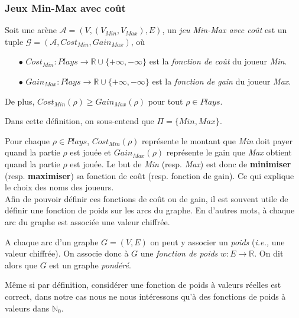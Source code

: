 
\subsubsection{Jeux Min-Max avec coût}


\begin{defi} $\text{ }$\\
	Soit une arène $\mathcal{A} = (V, (V_{Min}, V_{Max}), E) $, 
	un \textit{jeu Min-Max avec coût} est un tuple $\mathcal{G} = (\mathcal{A}, Cost_{Min}, Gain_{Max})$, où
	\begin{enumerate}
		\item[$\bullet$] $Cost_{Min}: Plays \rightarrow \mathbb{R} \cup \{+ \infty, -\infty \}$ est la \textit{fonction de coût} du joueur \textit{Min}.
		\item[$\bullet$] $Gain_{Max}: Plays \rightarrow \mathbb{R} \cup \{ + \infty, -\infty \}$ est la \textit{fonction de gain} du joueur \textit{Max}.
	\end{enumerate}
	
De plus, $Cost_{Min}(\rho) \geq Gain_{Max}(\rho)$ pour tout $\rho \in Plays$.
		
\end{defi}

\begin{rem}
	Dans cette définition, on sous-entend que $\Pi = \{ Min, Max \}$.
\end{rem}

Pour chaque $\rho \in Plays$, $Cost_{Min}(\rho)$ représente le montant que \textit{Min} doit payer quand la partie $\rho$ est jouée et $Gain_{Max}(\rho)$ représente le gain que \textit{Max} obtient quand la partie $\rho$ est jouée.
Le but de \textit{Min} (resp. \textit{Max}) est donc de \textbf{minimiser} (resp. \textbf{maximiser}) sa fonction de coût (resp. fonction de gain). Ce qui explique le choix des noms des joueurs.\\

Afin de pouvoir définir ces fonctions de coût ou de gain, il est souvent utile de définir une fonction de poids sur les arcs du graphe. En d'autres mots, à chaque arc du graphe est associée une valeur chiffrée.


\begin{defi}
	\label{def:fonctionPoids}
	A chaque arc d'un graphe $G = (V,E)$ on peut y associer un \textit{poids} (\emph{i.e.,} une valeur chiffrée). On associe donc à $G$ une \textit{fonction de poids}  $w : E \rightarrow \mathbb{R}$. On dit alors que $G$ est un graphe \textit{pondéré}.
\end{defi}
\begin{rem}
	Même si par définition, considérer une fonction de poids à valeurs réelles est correct, dans notre cas nous ne nous intéressons qu'à des fonctions de poids à valeurs dans $\mathbb{N}_0$.
\end{rem}

